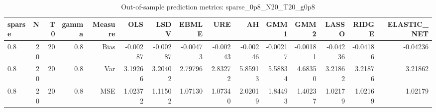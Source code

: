 \begin{table}[!htbp]\centering
\caption{Out-of-sample prediction metrics: sparse_0p8_N20_T20_g0p8}
\label{tab:table3_sparse_0p8_N20_T20_g0p8}
\begin{tabular}{lrrrrrrrrrrrrrr}
\hline
sparse & N & T0 & gamma & Measure & OLS & LSDV & EBMLE & URE & AH & GMM1 & GMM2 & LASSO & RIDGE & ELASTIC_NET \\
\hline
0.8 & 20 & 20 & 0.8 & Bias & -0.00287 & -0.00287 & -0.00473 & -0.00243 & -0.00246 & -0.00217 & -0.00181 & -0.04236 & -0.04186 & -0.04236 \\
0.8 & 20 & 20 & 0.8 & Var & 3.19266 & 3.20402 & 2.79796 & 2.83272 & 5.85913 & 5.58834 & 4.68350 & 3.21862 & 3.21876 & 3.21862 \\
0.8 & 20 & 20 & 0.8 & MSE & 1.02372 & 1.11502 & 1.07130 & 1.07340 & 2.02019 & 1.84493 & 1.40237 & 1.02179 & 1.02169 & 1.02179 \\
\hline
\end{tabular}
\end{table}

